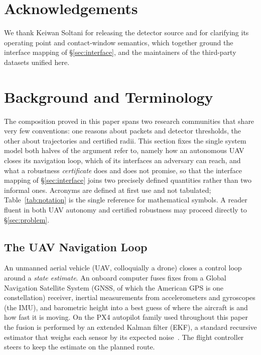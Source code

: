 \ifanon\else

\section*{Acknowledgements}
We thank Keiwan Soltani for releasing the  detector source and
for clarifying its operating point and contact-window semantics, which together
ground the interface mapping of \S\ref{sec:interface}, and the maintainers of
the third-party datasets unified here.
\fi




\appendix

\section{Background and Terminology}
\label{sec:background}
The composition proved in this paper spans two research communities that share
very few conventions: one reasons about packets and detector thresholds, the
other about trajectories and certified radii. This section fixes the single
system model both halves of the argument refer to, namely how an autonomous UAV closes
its navigation loop, which of its interfaces an adversary can reach, and what a
robustness \emph{certificate} does and does not promise, so that the interface
mapping of \S\ref{sec:interface} joins two precisely defined quantities rather
than two informal ones. Acronyms are defined at first use and not tabulated;
Table~\ref{tab:notation} is the single reference for mathematical symbols. A
reader fluent in both UAV autonomy and certified robustness may proceed directly
to \S\ref{sec:problem}.

\subsection{The UAV Navigation Loop}
An unmanned aerial vehicle (UAV, colloquially a drone) closes a control loop
around a \emph{state estimate}. An onboard computer fuses fixes from a Global
Navigation Satellite System (GNSS, of which the American GPS is one
constellation) receiver, inertial measurements from accelerometers and
gyroscopes (the IMU), and barometric height into a best guess of where the
aircraft is and how fast it is moving. On the PX4 autopilot family used
throughout this paper the fusion is performed by an extended Kalman filter
(EKF), a standard recursive estimator that weighs each sensor by its expected
noise~\cite{kong2024px4ekf}. The flight controller steers to keep the estimate
on the planned route.

